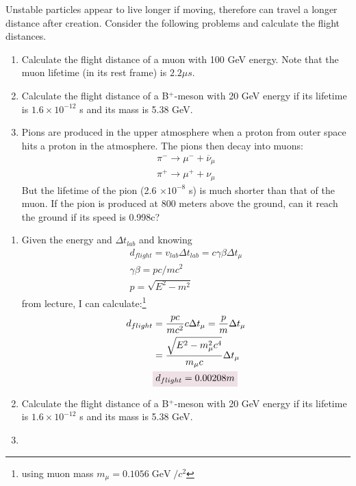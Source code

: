 \documentclass{article}
\DeclareMathOperator{\GeV}{GeV}
\begin{document}
\begin{problem}
    Unstable particles appear to live longer if moving, therefore can travel a longer distance after creation. Consider the following problems and calculate the flight distances. 
    \begin{enumerate}[label=\alph*.]
        \item Calculate the flight distance of a muon with 100 GeV energy. Note that the muon lifetime (in its rest frame) is $2.2 \mu s$. 
        \item Calculate the flight distance of a B$^{+}$-meson with 20 GeV energy if its lifetime is $1.6\times10^{-12}$ s and its mass is 5.38 GeV. 
        \item Pions are produced in the upper atmosphere when a proton from outer space hits a proton in the atmosphere. The pions then decay into muons:
        \begin{gather*} 
            \pi^{-}\rightarrow \mu^{-}+\overline{\nu}_\mu
            \\
            \pi^{+}\rightarrow \mu^{+}+\nu_\mu
        \end{gather*}
        But the lifetime of the pion (2.6 $\times10^{-8}$ s) is much shorter than that of the muon. If the pion is produced at 800 meters above the ground, can it reach the ground if its speed is 0.998c?
    \end{enumerate}
    \answerline
    \begin{enumerate}[label=\alph*.]
        \item Given the energy and $\Delta t_{lab}$ and knowing 
        \begin{gather*}
            d_{flight}=v_{lab}\Delta t_{lab}=\boxed{c\gamma\beta\Delta t_{\mu}}
            \\
            \gamma\beta=pc/mc^2
            \\
            p=\sqrt{E^2-m^2}
        \end{gather*} 
        from lecture, I can calculate:\footnote{using muon mass $m_\mu=0.1056\GeV/c^2$} 
        \begin{align*}
            d_{flight}&=\frac{pc}{mc^2}c\Delta t_{\mu}=\frac{p}{m}\Delta t_{\mu}
            \\
            &=\frac{\sqrt{E^2-m_{\mu}^2c^4}}{m_{\mu}c}\Delta t_{\mu}
            \\
            &\coloredanswer{d_{flight}=0.00208m}
        \end{align*}
        \item Calculate the flight distance of a B$^{+}$-meson with 20 GeV energy if its lifetime is $1.6\times10^{-12}$ s and its mass is 5.38 GeV. 
        \item 
    \end{enumerate}
\end{problem}
\end{document}
